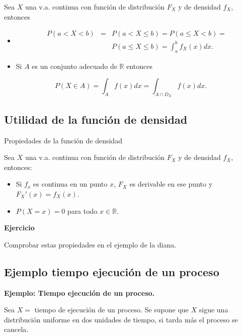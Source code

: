 \documentclass[]{book}
\providecommand{\tightlist}{%
  \setlength{\itemsep}{0pt}\setlength{\parskip}{0pt}}
\begin{document}
Sea \(X\) una v.a. continua con función de distribución \(F_X\) y de
densidad \(f_X\), entonces

\begin{itemize}
\item
  \begin{eqnarray*}
  P(a< X< b) &=&  P(a<X\leq b)= P(a\leq X< b)=\\
   & & P(a\leq X\leq b)= \displaystyle\int_{a}^b f_X(x) dx.
  \end{eqnarray*}
\item
  Si \(A\) es un conjunto adecuado de \(\mathbb{R}\) entonces
\end{itemize}

\[
P(X\in A)=\displaystyle\int_{A} f(x) dx=\displaystyle\int_{A\cap D_X} f(x) dx.
\]

\hypertarget{utilidad-de-la-funciuxf3n-de-densidad-1}{%
\subsection{Utilidad de la función de densidad}\label{utilidad-de-la-funciuxf3n-de-densidad-1}}

Propiedades de la función de densidad

Sea \(X\) una v.a. continua con función de distribución \(F_X\) y de densidad \(f_X\), entonces:

\begin{itemize}
\tightlist
\item
  Si \(f_x\) es continua en un punto \(x\), \(F_X\) es derivable en ese punto y
  \(F_X'(x)=f_X(x).\)
\item
  \(P(X=x)=0\) para todo \(x\in\mathbb{R}.\)
\end{itemize}

\textbf{Ejercicio}

Comprobar estas propiedades en el ejemplo de la diana.

\hypertarget{ejemplo-tiempo-ejecuciuxf3n-de-un-proceso}{%
\subsection{Ejemplo tiempo ejecución de un proceso}\label{ejemplo-tiempo-ejecuciuxf3n-de-un-proceso}}

\textbf{Ejemplo: Tiempo ejecución de un proceso.}

Sea \(X=\) tiempo de ejecución de un proceso. Se supone que \(X\) sigue una distribución uniforme en dos unidades de tiempo, si tarda más el proceso se cancela.
\end{document}
